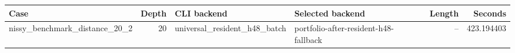 {\small
\begin{tabular}{lrllrr}
\hline
Case & Depth & CLI backend & Selected backend & Length & Seconds \\
\hline
nissy\_benchmark\_distance\_20\_2 & 20 & universal\_resident\_h48\_batch & portfolio-after-resident-h48-fallback & -- & 423.194403 \\
\hline
\end{tabular}
}
